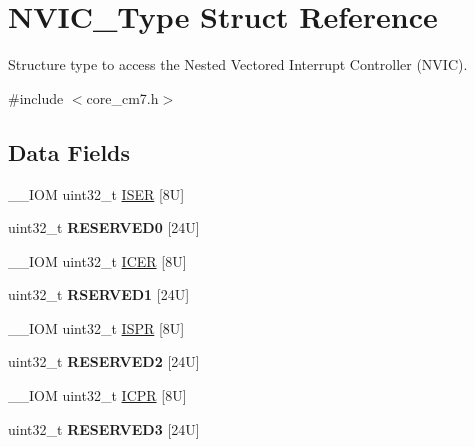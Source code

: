 \hypertarget{structNVIC__Type}{}\section{N\+V\+I\+C\+\_\+\+Type Struct Reference}
\label{structNVIC__Type}


Structure type to access the Nested Vectored Interrupt Controller (N\+V\+IC).  




{\ttfamily \#include $<$core\+\_\+cm7.\+h$>$}

\subsection*{Data Fields}
\begin{DoxyCompactItemize}
\item 
\+\_\+\+\_\+\+I\+OM uint32\+\_\+t \mbox{\hyperlink{structNVIC__Type_a99fe3791941bf69b7c1edf13e0b5383a}{I\+S\+ER}} \mbox{[}8\+U\mbox{]}
\item 
\mbox{\label{structNVIC__Type_a93c66a8842929d5f8e0d691a97261cc2}} 
uint32\+\_\+t {\bfseries R\+E\+S\+E\+R\+V\+E\+D0} \mbox{[}24\+U\mbox{]}
\item 
\+\_\+\+\_\+\+I\+OM uint32\+\_\+t \mbox{\hyperlink{structNVIC__Type_ad30ec76aa0be02aa9a56ff4bdc401180}{I\+C\+ER}} \mbox{[}8\+U\mbox{]}
\item 
\mbox{\label{structNVIC__Type_af7bfc2f8bd72f5e3e472edb209d9876c}} 
uint32\+\_\+t {\bfseries R\+S\+E\+R\+V\+E\+D1} \mbox{[}24\+U\mbox{]}
\item 
\+\_\+\+\_\+\+I\+OM uint32\+\_\+t \mbox{\hyperlink{structNVIC__Type_a58a1d427f4f45aa4bba77115ec25a2f9}{I\+S\+PR}} \mbox{[}8\+U\mbox{]}
\item 
\mbox{\label{structNVIC__Type_a80bce60f3405a1cde3d621eea35ac6b6}} 
uint32\+\_\+t {\bfseries R\+E\+S\+E\+R\+V\+E\+D2} \mbox{[}24\+U\mbox{]}
\item 
\+\_\+\+\_\+\+I\+OM uint32\+\_\+t \mbox{\hyperlink{structNVIC__Type_ae3c409719774e839b092bf3ea73c0545}{I\+C\+PR}} \mbox{[}8\+U\mbox{]}
\item 
\mbox{\label{structNVIC__Type_adf6616e950b18b3ef9c9c64e535b3ee2}} 
uint32\+\_\+t {\bfseries R\+E\+S\+E\+R\+V\+E\+D3} \mbox{[}24\+U\mbox{]}
\item 

\end{DoxyCompactItemize}
